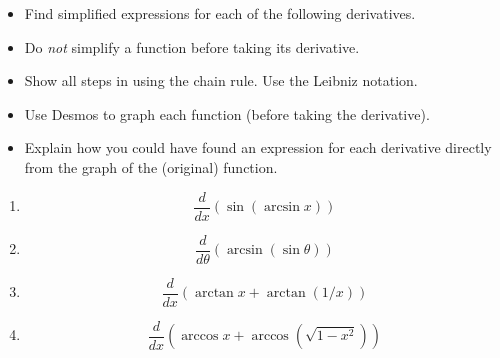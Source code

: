 \documentclass{ximera}
\begin{document}
\begin{exercise}  \label{Ehglkhfgjsdafn}
\begin{itemize}
\item Find simplified expressions for each of the following derivatives. 

\item Do \emph{not} simplify a function before taking its derivative. 

\item Show all steps in using the chain rule. Use the Leibniz notation. 

\item Use Desmos to graph each function (before taking the derivative).

\item Explain how you could have found an expression for each derivative directly from the graph of the (original) function. 

\end{itemize}

\begin{enumerate}
\item
\[
       \frac{d}{dx}\left( \sin(\arcsin x ) \right)
\]

\item 
\[
       \frac{d}{d\theta}\left( \arcsin(\sin \theta ) \right)
\]

\item 
\[
  \frac{d}{dx}\left( \arctan x + \arctan(1/x)  \right)
\]

\item
\[
    \frac{d}{dx}\left( \arccos x + \arccos\left(\sqrt{1-x^2}\right)  \right)
\] 
\end{enumerate}

\end{exercise}
\end{document}
